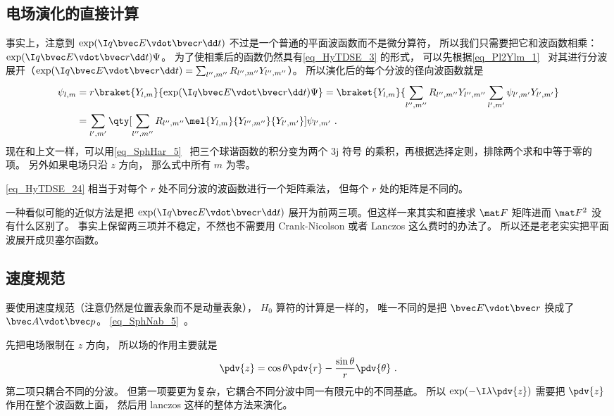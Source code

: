 \subsection{电场演化的直接计算}
事实上，注意到 $\exp(\I q\bvec E\vdot\bvec r\dd t)$ 不过是一个普通的平面波函数而不是微分算符， 所以我们只需要把它和波函数相乘： $\exp(\I q\bvec E\vdot\bvec r\dd t)\Psi$。 为了使相乘后的函数仍然具有\autoref{eq_HyTDSE_3} 的形式， 可以先根据\autoref{eq_Pl2Ylm_1}~ 对其进行分波展开（$\exp(\I q\bvec E\vdot\bvec r\dd t) = \sum_{l'',m''}R_{l'',m''}Y_{l'',m''}$）。 所以演化后的每个分波的径向波函数就是
\begin{equation}\label{eq_HyTDSE_24}
\begin{aligned}
\psi_{l,m} &= r\braket{Y_{l,m}}{\exp(\I q\bvec E\vdot\bvec r\dd t)\Psi} =
\braket{Y_{l,m}}{\sum_{l'',m''} R_{l'',m''} Y_{l'',m''} \sum_{l',m'} \psi_{l',m'} Y_{l',m'}}\\
&= \sum_{l',m'} \qty[\sum_{l'',m''}R_{l'',m''}  \mel{Y_{l,m}}{Y_{l'',m''}}{Y_{l',m'}}]\psi_{l',m'}~.
\end{aligned}
\end{equation}
现在和上文一样，可以用\autoref{eq_SphHar_5}~ 把三个球谐函数的积分变为两个 3j 符号 的乘积，再根据选择定则，排除两个求和中等于零的项。 另外如果电场只沿 $z$ 方向， 那么式中所有 $m$ 为零。

\autoref{eq_HyTDSE_24} 相当于对每个 $r$ 处不同分波的波函数进行一个矩阵乘法， 但每个 $r$ 处的矩阵是不同的。

一种看似可能的近似方法是把 $\exp(\I q\bvec E\vdot\bvec r\dd t)$ 展开为前两三项。但这样一来其实和直接求 $\mat F$ 矩阵进而 $\mat F^2$ 没有什么区别了。 事实上保留两三项并不稳定，不然也不需要用 Crank-Nicolson 或者 Lanczos 这么费时的办法了。 所以还是老老实实把平面波展开成贝塞尔函数。

\subsection{速度规范}
要使用速度规范（注意仍然是位置表象而不是动量表象）， $H_0$ 算符的计算是一样的， 唯一不同的是把 $\bvec E\vdot \bvec r$ 换成了 $\bvec A\vdot \bvec p$。 \autoref{eq_SphNab_5}~。

先把电场限制在 $z$ 方向， 所以场的作用主要就是
\begin{equation}\label{eq_HyTDSE_25}
\pdv{z} = \cos\theta\pdv{r} - \frac{\sin\theta}{r}\pdv{\theta}~.
\end{equation}
第二项只耦合不同的分波。 但第一项要更为复杂，它耦合不同分波中同一有限元中的不同基底。 所以 $\exp(-\I \lambda \pdv{z})$ 需要把 $\pdv{z}$ 作用在整个波函数上面， 然后用 lanczos 这样的整体方法来演化。

